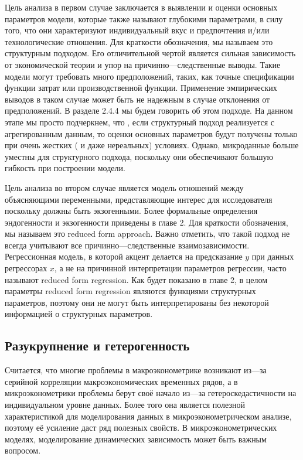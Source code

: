 	
	Цель анализа в первом случае заключается в выявлении и оценки основных параметров модели, которые также называют глубокими параметрами, в силу того, что они характеризуют индивидуальный вкус и предпочтения и/или технологические отношения. Для краткости обозначения, мы называем это структурным подходом. Его отличительной чертой является сильная зависимость от экономической теории и упор на причинно---следственные выводы. Такие модели могут требовать много предположений, таких, как точные спецификации функции затрат или производственной функции. Применение эмпирических выводов в таком случае может быть не надежным в случае отклонения от предположений. В разделе 2.4.4 мы будем говорить об этом подходе. На данном этапе мы просто подчеркнем, что , если структурный подход реализуется с агрегированным данным, то оценки основных параметров будут получены только при очень жестких ( и даже нереальных) условиях. Однако, микроданные больше уместны для структурного подхода, поскольку они обеспечивают большую гибкость при построении модели.
	
	
	Цель анализа во втором случае является модель отношений между объясняющими переменными, представляющие интерес для исследователя поскольку должны быть экзогенными. Более формальные определения эндогенности и экзогенности приведены в главе 2. Для краткости обозначения, мы называем это reduced form approach. Важно отметить, что такой подход не всегда учитывают все причинно---следственные взаимозависимости. Регрессионная модель, в которой акцент делается на предсказание $y$ при данных регрессорах $x$, а не на причинной интерпретации параметров регрессии, часто называют reduced form regression. Как будет показано в главе 2, в целом параметры reduced form regression являются функциями структурных параметров, поэтому они не могут быть интерпретированы без некоторой информацией о структурных параметров.



\subsection{Разукрупнение и гетерогенность}

	Считается, что многие проблемы в макроэконометрике возникают из---за серийной корреляции макроэкономических временных рядов, а в микроэконометрики проблемы берут своё начало из---за гетероскедастичности на индивидуальном уровне данных. Более того она является полезной характеристикой для моделирования данных в микроэконометрическом анализе, поэтому её усиление даст ряд полезных свойств. В  микроэконометрических моделях, моделирование динамических зависимость может быть важным вопросом.
	

